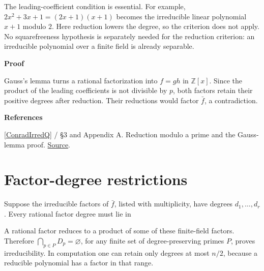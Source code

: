 \documentclass[11pt,a4paper,oneside,openany]{book}
\newcommand{\atlasdisplay}[1]{\par\begingroup\centering\vspace{3pt}\noindent\adjustbox{max width=\linewidth}{\(\displaystyle #1\)}\par\vspace{5pt}\endgroup}
\newenvironment{sources}{\par\smallskip\begingroup\footnotesize\color{atlasgray}\leftskip=10pt\setlength{\parskip}{2pt}}{\par\endgroup\smallskip}
\begin{document}
\color{black} The leading-coefficient condition is essential. For example, \(2x^2+3x+1=(2x+1)(x+1)\) becomes the irreducible linear polynomial \(x+1\) modulo \(2\). Here reduction lowers the degree, so the criterion does not apply. No squarefreeness hypothesis is separately needed for the reduction criterion: an irreducible polynomial over a finite field is already separable.\par


\begin{atlasblock}[standard]
\textbf{\sffamily Proof}\par\smallskip
\color{black} Gauss's lemma turns a rational factorization into \(f=gh\) in \(\mathbb Z[x]\). Since the product of the leading coefficients is not divisible by \(p\), both factors retain their positive degrees after reduction. Their reductions would factor \(\bar f\), a contradiction.\par
\end{atlasblock}\color{black}
\begin{sources}
\textbf{References}\par\smallskip
\noindent\hyperlink{ref:ConradIrredQ}{[ConradIrredQ]} / §3 and Appendix A. Reduction modulo a prime and the Gauss-lemma proof. \href{https://kconrad.math.uconn.edu/blurbs/ringtheory/irredtestsoverQ.pdf}{Source}.\par
\end{sources}\color{black}
\section{Factor-degree restrictions}
\color{black} Suppose the irreducible factors of \(\bar f\), listed with multiplicity, have degrees \(d_1,\ldots,d_r\). Every rational factor degree must lie in\par


\atlasdisplay{D_p=\left\{\sum_{i\in I}d_i: I\subseteq\{1,\ldots,r\}\right\}\cap\{1,\ldots,n-1\}.}

\color{black} A rational factor reduces to a product of some of these finite-field factors. Therefore \(\bigcap_{p\in P}D_p=\varnothing\), for any finite set of degree-preserving primes \(P\), proves irreducibility. In computation one can retain only degrees at most \(n/2\), because a reducible polynomial has a factor in that range.\par
\end{document}
